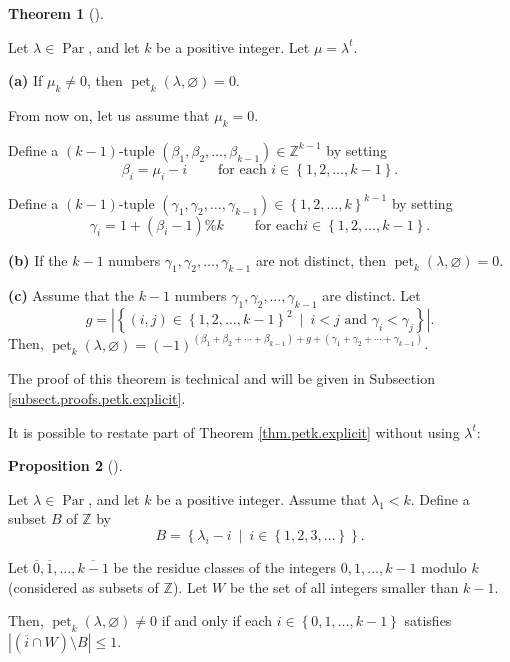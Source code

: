 \documentclass[numbers=enddot,12pt,final,onecolumn,notitlepage]{scrartcl}%
\theoremstyle{definition}
\newtheorem{theo}{Theorem}[section]
\newenvironment{theorem}[1][]
{\begin{theo}[#1]\begin{leftbar}}
{\end{leftbar}\end{theo}}
\newtheorem{prop}[theo]{Proposition}
\newenvironment{proposition}[1][]
{\begin{prop}[#1]\begin{leftbar}}
{\end{leftbar}\end{prop}}
\begin{document}
\begin{theorem}
\label{thm.petk.explicit}Let $\lambda\in\operatorname*{Par}$, and let $k$ be a
positive integer. Let $\mu=\lambda^{t}$.

\textbf{(a)} If $\mu_{k}\neq0$, then $\operatorname*{pet}\nolimits_{k}\left(
\lambda,\varnothing\right)  =0$.

From now on, let us assume that $\mu_{k}=0$.

Define a $\left(  k-1\right)  $-tuple $\left(  \beta_{1},\beta_{2}%
,\ldots,\beta_{k-1}\right)  \in\mathbb{Z}^{k-1}$ by setting%
\begin{equation}
\beta_{i}=\mu_{i}-i\ \ \ \ \ \ \ \ \ \ \text{for each }i\in\left\{
1,2,\ldots,k-1\right\}  . \label{eq.thm.petk.explicit.beti=}%
\end{equation}


Define a $\left(  k-1\right)  $-tuple $\left(  \gamma_{1},\gamma_{2}%
,\ldots,\gamma_{k-1}\right)  \in\left\{  1,2,\ldots,k\right\}  ^{k-1}$ by
setting%
\begin{equation}
\gamma_{i}=1+\left(  \beta_{i}-1\right)  \%k\ \ \ \ \ \ \ \ \ \ \text{for each
}i\in\left\{  1,2,\ldots,k-1\right\}  . \label{eq.thm.petk.explicit.gammi=}%
\end{equation}


\textbf{(b)} If the $k-1$ numbers $\gamma_{1},\gamma_{2},\ldots,\gamma_{k-1}$
are not distinct, then $\operatorname*{pet}\nolimits_{k}\left(  \lambda
,\varnothing\right)  =0$.

\textbf{(c)} Assume that the $k-1$ numbers $\gamma_{1},\gamma_{2}%
,\ldots,\gamma_{k-1}$ are distinct. Let
\[
g=\left\vert \left\{  \left(  i,j\right)  \in\left\{  1,2,\ldots,k-1\right\}
^{2}\ \mid\ i<j\text{ and }\gamma_{i}<\gamma_{j}\right\}  \right\vert .
\]
Then, $\operatorname*{pet}\nolimits_{k}\left(  \lambda,\varnothing\right)
=\left(  -1\right)  ^{\left(  \beta_{1}+\beta_{2}+\cdots+\beta_{k-1}\right)
+g+\left(  \gamma_{1}+\gamma_{2}+\cdots+\gamma_{k-1}\right)  }$.
\end{theorem}

The proof of this theorem is technical and will be given in Subsection
\ref{subsect.proofs.petk.explicit}.

It is possible to restate part of Theorem \ref{thm.petk.explicit} without
using $\lambda^{t}$:

\begin{proposition}
\label{prop.petk.explicit-old}Let $\lambda\in\operatorname*{Par}$, and let $k$
be a positive integer. Assume that $\lambda_{1}<k$. Define a subset $B$ of
$\mathbb{Z}$ by
\[
B=\left\{  \lambda_{i}-i\ \mid\ i\in\left\{  1,2,3,\ldots\right\}  \right\}
.
\]


Let $\overline{0},\overline{1},\ldots,\overline{k-1}$ be the residue classes
of the integers $0,1,\ldots,k-1$ modulo $k$ (considered as subsets of
$\mathbb{Z}$). Let $W$ be the set of all integers smaller than $k-1$.

Then, $\operatorname*{pet}\nolimits_{k}\left(  \lambda,\varnothing\right)
\neq0$ if and only if each $i\in\left\{  0,1,\ldots,k-1\right\}  $ satisfies
$\left\vert \left(  \overline{i}\cap W\right)  \setminus B\right\vert \leq1$.
\end{proposition}
\end{document}
